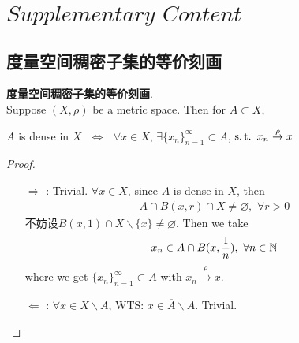 \ifx\allfiles\undefined


	\else
	\fi
\appendix
\chapter{$Supplementary \,\, Content$}\label{appendix A}

\section{度量空间稠密子集的等价刻画}
	\begin{lemma}\label{lemma A.1.1}
		\textbf{度量空间稠密子集的等价刻画}. \\
		Suppose $(X , \rho)$ be a metric space. Then for $A \subset X$, 
		\begin{center}
			$A$ is dense in $X$ $\,\, \Leftrightarrow \,\,$ $\forall x \in X$, $\exists \{ x_n \}_{n = 1}^{\infty} \subset A$, $\operatorname{s.t.} \,\, x_n \overset{\rho}{\to} x$
		\end{center}
	
		\vspace*{4em}
		
		\begin{proof}
			\begin{enumerate}
				\item[$\Rightarrow$]: Trivial. $\forall x \in X$, since $A$ is dense in $X$, then
				\begin{align}
					A \cap B(x , r) \cap X \neq \varnothing , \,\, \forall r > 0
				\end{align}
				不妨设$B(x , 1) \cap X \backslash \{ x \} \neq \varnothing$. Then we take
				\begin{align}
					x_n \in A \cap B(x , \frac{1}{n}) , \,\, \forall n \in \mathbb{N}
				\end{align}
				where we get $\{ x_n \}_{n = 1}^{\infty} \subset A$ with $x_n \overset{\rho}{\to} x$.
				
				\vspace*{3em}
				
				\item[$\Leftarrow$]: $\forall x \in X \backslash A$, WTS: $x \in \overline{A} \backslash A$. Trivial.
			\end{enumerate}
		\end{proof}
	\end{lemma}







	\ifx\allfiles\undefined

\fi